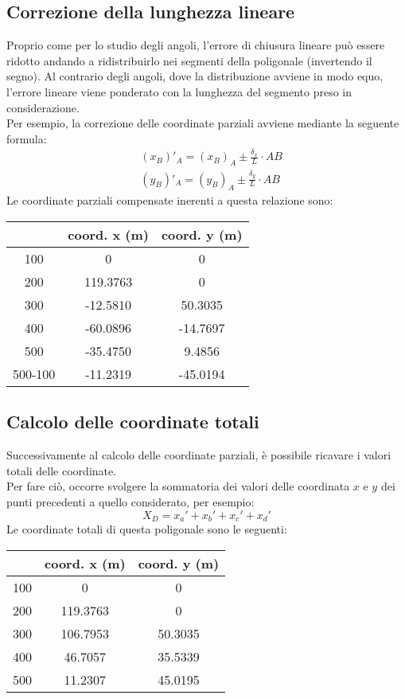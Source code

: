 \subsection{Correzione della lunghezza lineare}
Proprio come per lo studio degli angoli, l'errore di chiusura lineare può essere ridotto andando a ridistribuirlo nei segmenti della poligonale (invertendo il segno). Al contrario degli angoli, dove la distribuzione avviene in modo equo, l'errore lineare viene ponderato con la lunghezza del segmento preso in considerazione.\\
Per esempio, la correzione delle coordinate parziali avviene mediante la seguente formula:
\begin{equation} \begin{split}
   & (x_B)'_A = (x_B)_A \pm \frac{\delta_x}{L} \cdot AB \\
   & (y_B)'_A = (y_B)_A \pm \frac{\delta_y}{L} \cdot AB
\end{split}
\end{equation}
Le coordinate parziali compensate inerenti a questa relazione sono:
\begin{table}[H] \centering
\begin{tabular}{ccc}
\toprule
 & coord. x (m)       & coord. y (m)       \\
\midrule
100 & 0  & 0                \\
200 & 119.3763 & 0          \\
300 & -12.5810 & 50.3035    \\
400 & -60.0896 & -14.7697   \\
500 & -35.4750 & 9.4856     \\
500-100 & -11.2319 & -45.0194  \\
\bottomrule
\end{tabular}
\end{table}

\subsection{Calcolo delle coordinate totali}
Successivamente al calcolo delle coordinate parziali, è possibile ricavare i valori totali delle coordinate.\\
Per fare ciò, occorre svolgere la sommatoria dei valori delle coordinata $x$ e $y$ dei punti precedenti a quello considerato, per esempio:
\begin{equation}
    X_D = x_a' + x_b' + x_c' + x_d'
\end{equation}
Le coordinate totali di questa poligonale sono le seguenti:
\begin{table}[H] \centering
\begin{tabular}{ccc}
\toprule
 & coord. x (m)       & coord. y (m)       \\
\midrule
100 & 0  & 0                \\
200 & 119.3763 & 0          \\
300 & 106.7953 & 50.3035    \\
400 & 46.7057 & 35.5339   \\
500 & 11.2307 & 45.0195     \\
\bottomrule
\end{tabular}
\end{table}